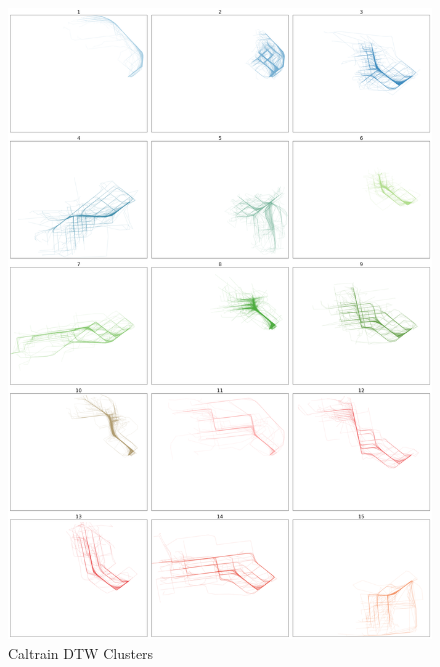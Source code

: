 \documentclass[a4paper, 12pt]{article}
\begin{document}
\begin{figure}[htbp!]
    \centering
    \includegraphics[width=1\textwidth]{Caltrain DTW.png}
    \caption{Caltrain DTW Clusters}
    \label{fig36}
\end{figure}
\end{document}
